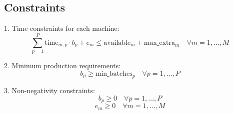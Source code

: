 \documentclass{article}
\begin{document}
\subsection*{Constraints}

1. Time constraints for each machine:
\[
\sum_{p=1}^{P} \text{time}_{m,p} \cdot b_p + e_m \leq \text{available}_m + \text{max\_extra}_m \quad \forall m = 1, \ldots, M
\]

2. Minimum production requirements:
\[
b_p \geq \text{min\_batches}_p \quad \forall p = 1, \ldots, P
\]

3. Non-negativity constraints:
\[
b_p \geq 0 \quad \forall p = 1, \ldots, P
\]
\[
e_m \geq 0 \quad \forall m = 1, \ldots, M
\]
\end{document}
